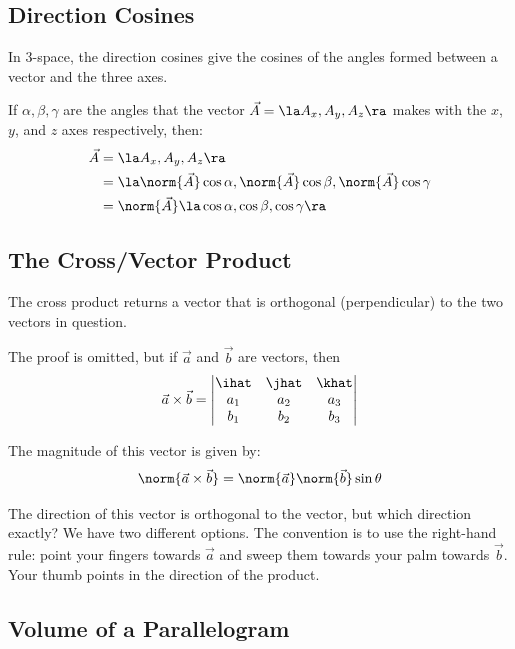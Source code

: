 \documentclass[12pt]{article}
\begin{document}
\subsection{Direction Cosines}
In 3-space, the direction cosines give the cosines of the angles formed between a vector and the three axes.

If $\alpha, \beta, \gamma$ are the angles that the vector $\vec{A} = \la A_x, A_y, A_z \ra$ makes with the $x$, $y$, and $z$ axes respectively, then:
\[
\begin{aligned}
\vec{A} &= \la A_x, A_y, A_z \ra \\
&= \la \norm{\vec{A}}\cos{\alpha}, \norm{\vec{A}}\cos{\beta}, \norm{\vec{A}}\cos{\gamma} \\
&= \norm{\vec{A}} \la \cos{\alpha}, \cos{\beta}, \cos{\gamma} \ra
\end{aligned}
\]

\subsection{The Cross/Vector Product}
The cross product returns a vector that is orthogonal (perpendicular) to the two vectors in question. 

The proof is omitted, but if $\vec{a}$ and $\vec{b}$ are vectors, then 
\[ \vec{a} \times \vec{b} =
\begin{vmatrix}
\ihat & \jhat & \khat \\
a_1 & a_2 & a_3 \\
b_1 & b_2 & b_3 
\end{vmatrix} 
\]

The magnitude of this vector is given by: \[ \norm{\vec{a} \times \vec{b}} = \norm{\vec{a}}\norm{\vec{b}}\sin{\theta} \]

The direction of this vector is orthogonal to the vector, but which direction exactly? We have two different options. The convention is to use the right-hand rule: point your fingers towards $\vec{a}$ and sweep them towards your palm towards $\vec{b}$. Your thumb points in the direction of the product.

\subsection{Volume of a Parallelogram}
\begin{figure}[h!]
\centering
{}
\end{figure}
\end{document}
